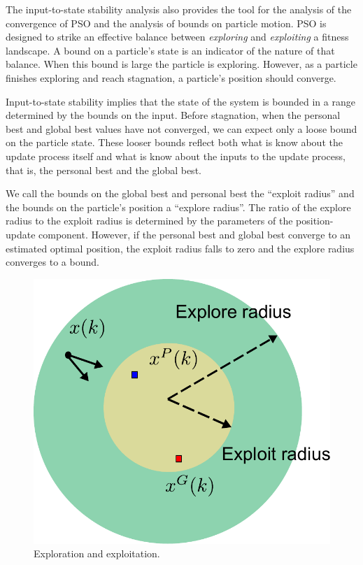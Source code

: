 \documentclass{sig-alternate}
\begin{document}
The input-to-state stability analysis also provides the tool for the analysis of the convergence of PSO and the analysis of bounds on particle motion.
PSO is designed to strike an effective balance between \emph{exploring} and \emph{exploiting} a fitness landscape.
A bound on a particle's state is an indicator of the nature of that balance.
When this bound is large the particle is exploring.
However, as a particle finishes exploring and reach stagnation, a particle's position should converge.

Input-to-state stability implies that the state of the system is bounded in a range determined by the bounds on the input.
Before stagnation, when the personal best and global best values have not converged, we can expect only a loose bound on the particle state.
These looser bounds reflect both what is know about the update process itself and what is know about the inputs to the update process, that is, the personal best and the global best.

We call the bounds on the global best and personal best the ``exploit radius'' and the bounds on the particle's position a ``explore radius''.
The ratio of the explore radius to the exploit radius is determined by the parameters of the position-update component.
However, if the personal best and global best converge to an estimated optimal position, the exploit radius falls to zero and the explore radius converges to a bound.

\begin{figure}
\centering
\includegraphics[width=0.6\linewidth]{./explore_and_exploit.pdf}
\caption{Exploration and exploitation.}
\label{fig:explore_and_exploit}
\end{figure}

\end{document}
